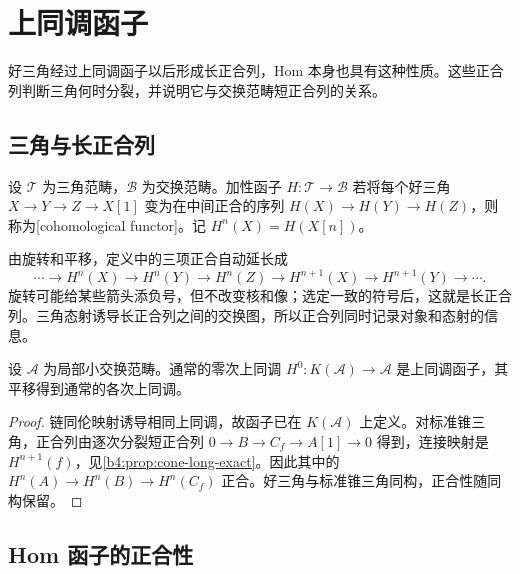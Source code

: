 
\section{上同调函子}
\label{b4:sec:1603}

好三角经过上同调函子以后形成长正合列，Hom 本身也具有这种性质。这些正合列判断三角何时分裂，并说明它与交换范畴短正合列的关系。


%
%

\subsection{三角与长正合列}
\label{b4:subsec:1603:01}

\begin{definition}\label{b4:def:cohomological-functor}
设 \(\mathcal T\) 为三角范畴，\(\mathcal B\) 为交换范畴。加性函子 \(H:\mathcal T\to\mathcal B\) 若将每个好三角 \(X\to Y\to Z\to X[1]\) 变为在中间正合的序列 \(H(X)\to H(Y)\to H(Z)\)，则称为[cohomological functor]。记 \(H^n(X)=H(X[n])\)。
\end{definition}

由旋转和平移，定义中的三项正合自动延长成
\[
 \cdots\to H^n(X)\to H^n(Y)\to H^n(Z)
 \to H^{n+1}(X)\to H^{n+1}(Y)\to\cdots.
\]
旋转可能给某些箭头添负号，但不改变核和像；选定一致的符号后，这就是长正合列。三角态射诱导长正合列之间的交换图，所以正合列同时记录对象和态射的信息。

\begin{proposition}\label{b4:prop:cohomology-on-homotopy}
设 \(\mathcal A\) 为局部小交换范畴。通常的零次上同调 \(H^0:K(\mathcal A)\to\mathcal A\) 是上同调函子，其平移得到通常的各次上同调。
\end{proposition}
\begin{proof}
链同伦映射诱导相同上同调，故函子已在 \(K(\mathcal A)\) 上定义。对标准锥三角，正合列由逐次分裂短正合列 \(0\to B\to C_f\to A[1]\to0\) 得到，连接映射是 \(H^{n+1}(f)\)，见\cref{b4:prop:cone-long-exact}。因此其中的 \(H^n(A)\to H^n(B)\to H^n(C_f)\) 正合。好三角与标准锥三角同构，正合性随同构保留。
\end{proof}

\subsection{Hom 函子的正合性}
\label{b4:subsec:1603:02}

